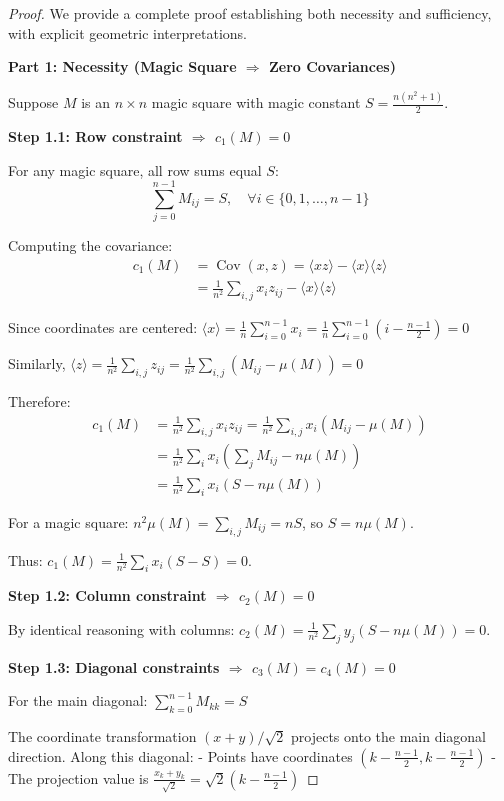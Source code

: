 \begin{proof}
We provide a complete proof establishing both necessity and sufficiency, with explicit geometric interpretations.

\textbf{Part 1: Necessity (Magic Square $\Rightarrow$ Zero Covariances)}

Suppose $M$ is an $n \times n$ magic square with magic constant $S = \frac{n(n^2+1)}{2}$.

\textbf{Step 1.1: Row constraint $\Rightarrow$ $c_1(M) = 0$}

For any magic square, all row sums equal $S$:
\[
\sum_{j=0}^{n-1} M_{ij} = S, \quad \forall i \in \{0,1,\ldots,n-1\}
\]

Computing the covariance:
\begin{align}
c_1(M) &= \operatorname{Cov}(x,z) = \langle xz \rangle - \langle x \rangle \langle z \rangle\\
&= \frac{1}{n^2}\sum_{i,j}x_i z_{ij} - \langle x \rangle \langle z \rangle
\end{align}

Since coordinates are centered: $\langle x \rangle = \frac{1}{n}\sum_{i=0}^{n-1} x_i = \frac{1}{n}\sum_{i=0}^{n-1} (i - \frac{n-1}{2}) = 0$

Similarly, $\langle z \rangle = \frac{1}{n^2}\sum_{i,j} z_{ij} = \frac{1}{n^2}\sum_{i,j} (M_{ij} - \mu(M)) = 0$

Therefore:
\begin{align}
c_1(M) &= \frac{1}{n^2}\sum_{i,j}x_i z_{ij} = \frac{1}{n^2}\sum_{i,j}x_i (M_{ij} - \mu(M))\\
&= \frac{1}{n^2}\sum_{i}x_i\left(\sum_{j} M_{ij} - n\mu(M)\right)\\
&= \frac{1}{n^2}\sum_{i}x_i(S - n\mu(M))
\end{align}

For a magic square: $n^2 \mu(M) = \sum_{i,j} M_{ij} = nS$, so $S = n\mu(M)$.

Thus: $c_1(M) = \frac{1}{n^2}\sum_{i}x_i(S - S) = 0$.

\textbf{Step 1.2: Column constraint $\Rightarrow$ $c_2(M) = 0$}

By identical reasoning with columns: $c_2(M) = \frac{1}{n^2}\sum_{j}y_j(S - n\mu(M)) = 0$.

\textbf{Step 1.3: Diagonal constraints $\Rightarrow$ $c_3(M) = c_4(M) = 0$}

For the main diagonal: $\sum_{k=0}^{n-1} M_{kk} = S$

The coordinate transformation $(x+y)/\sqrt{2}$ projects onto the main diagonal direction. Along this diagonal:
- Points have coordinates $\left(k-\frac{n-1}{2}, k-\frac{n-1}{2}\right)$ 
- The projection value is $\frac{x_k + y_k}{\sqrt{2}} = \sqrt{2}(k - \frac{n-1}{2})$


\end{proof}
